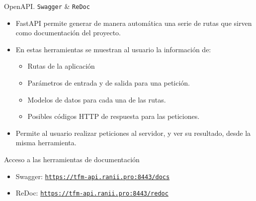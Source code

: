 \documentclass[aspectratio=169,xcolor=dvipsnames]{beamer}
\begin{document}
	\begin{frame}{OpenAPI. \texttt{Swagger} \& \texttt{ReDoc}}
		\begin{itemize}
			\item FastAPI permite generar de manera automática una serie de rutas que sirven como documentación del proyecto.
			
			\item En estas herramientas se muestran al usuario la información de: 
			
			\begin{itemize}
				\item Rutas de la aplicación
				
				\item Parámetros de entrada y de salida para una petición.
				
				\item Modelos de datos para cada una de las rutas.
				
				\item Posibles códigos HTTP de respuesta para las peticiones.
			\end{itemize}
		
			\item Permite al usuario realizar peticiones al servidor, y ver su resultado, desde la misma herramienta.
		\end{itemize}
		
		\begin{alertblock}{Acceso a las herramientas de documentación}
			\begin{itemize}
				\item Swagger: \href{https://tfm-api.ranii.pro:8443/docs}{\texttt{https://tfm-api.ranii.pro:8443/docs}}
				
				\item ReDoc: \href{https://tfm-api.ranii.pro:8443/redoc}{\texttt{https://tfm-api.ranii.pro:8443/redoc}}
			\end{itemize}
		\end{alertblock}
		
	\end{frame}
	
	
\end{document}
